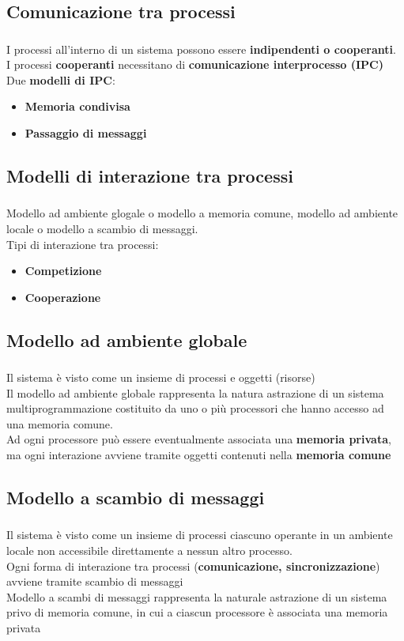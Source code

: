 \documentclass{beamer}
\newenvironment{mainframe}{
	\begin{frame}
		\frametitle{\insertsubsection}
		\framesubtitle{\insertsection}
	}{
	\end{frame}
}
\begin{document}
\subsection{Comunicazione tra processi}
\begin{mainframe}
	I processi all'interno di un sistema possono essere \textbf{indipendenti o cooperanti}.\\
	I processi \textbf{cooperanti} necessitano di \textbf{comunicazione interprocesso (IPC)}\\
	Due \textbf{modelli di IPC}:
	\begin{itemize}
		\item \textbf{Memoria condivisa}
		\item \textbf{Passaggio di messaggi}
	\end{itemize}
\end{mainframe}
\subsection{Modelli di interazione tra processi}
\begin{mainframe}
	Modello ad ambiente glogale o modello a memoria comune, modello ad ambiente locale o modello a scambio di messaggi.\\
	Tipi di interazione tra processi:
	\begin{itemize}
		\item \textbf{Competizione}
		\item \textbf{Cooperazione}
	\end{itemize}
\end{mainframe}
\subsection{Modello ad ambiente globale}
\begin{mainframe}
	Il sistema è visto come un insieme di processi e oggetti (risorse)\\
	Il modello ad ambiente globale rappresenta la natura astrazione di un sistema multiprogrammazione costituito da uno o più processori che hanno accesso ad una memoria comune.\\
	Ad ogni processore può essere eventualmente associata una \textbf{memoria privata}, ma ogni interazione avviene tramite oggetti contenuti nella \textbf{memoria comune}
\end{mainframe}
\subsection{Modello a scambio di messaggi}
\begin{mainframe}
	Il sistema è visto come un insieme di processi ciascuno operante in un ambiente locale non accessibile direttamente a nessun altro processo.\\
	Ogni forma di interazione tra processi (\textbf{comunicazione, sincronizzazione}) avviene tramite scambio di messaggi\\
	Modello a scambi di messaggi rappresenta la naturale astrazione di un sistema privo di memoria comune, in cui a ciascun processore è associata una memoria privata
\end{mainframe}
\end{document}
